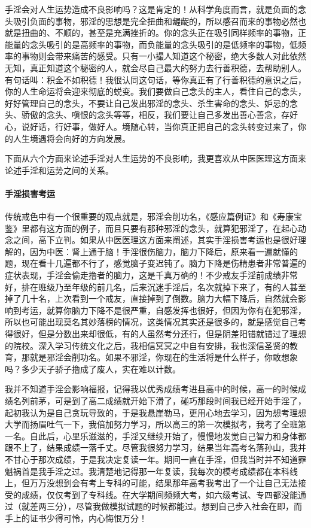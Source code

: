手淫会对人生运势造成不良影响吗？这是肯定的！从科学角度而言，就是负面的念头吸引负面的事物，邪淫的思想是完全扭曲和龌龊的，所以感召而来的事物必然也就是扭曲的、不顺的，甚至是充满挫折的。你的念头正在吸引同样频率的事物，正能量的念头吸引的是高频率的事物，而负能量的念头吸引的是低频率的事物，低频率的事物则会带来痛苦的感受。只有一小撮人知道这个秘密，绝大多数人对此依然无知，真正知道这个秘密的人，就会尽自己最大的努力去行善积德，去帮助别人。有句话叫：积金不如积德！我很认同这句话，等你真正有了行善积德的意识之后，你的人生命运将会迎来彻底的蜕变。我们要做自己念头的主人，看住自己的念头，好好管理自己的念头，不要让自己发出邪淫的念头、杀生害命的念头、妒忌的念头、骄傲的念头、嗔恨的念头等等，相反，我们要让自己多发出善心善念，存好心，说好话，行好事，做好人。境随心转，当你真正把自己的念头转变过来了，你的人生境遇将会向好的方向发展。

下面从六个方面来论述手淫对人生运势的不良影响，我更喜欢从中医医理这方面来论述手淫和运势之间的关系。

\paragraph{手淫损害考运}

传统戒色中有一个很重要的观点就是，邪淫会削功名，《感应篇例证》和《寿康宝鉴》里都有这方面的例子，而且只要有那种邪淫的念头，就算犯邪淫了，在起心动念之间，高下立判。如果从中医医理这方面来阐述，其实手淫损害考运也是很好理解的，因为中医：肾上通于脑！手淫很伤脑力，脑力下降后，原来看一遍就懂的题，现在看十几遍都不行了，感觉脑子变迟钝了。脑力下降是伤精患者非常普遍的症状表现，手淫会偷走撸者的脑力，这是千真万确的！不少戒友手淫前成绩非常好，排在班级乃至年级的前几名，后来沉迷手淫后，名次就掉下来了，有的人甚至掉了几十名，上次看到一个戒友，直接掉到了倒数。脑力大幅下降后，自然就会影响到考运，就算你脑力下降不是很严重，自感发挥也很好，但因为你有在犯邪淫，所以也可能出现莫名其妙落榜的情况，这类情况其实还是很多的，就是感觉自己考得很好，但是分数出来却很低，有的人虽然考分还行，但是阴差阳错就错过了理想的院校。深入学习传统文化之后，我相信冥冥之中自有安排，我也深信圣贤的教育，那就是邪淫会削功名。如果不邪淫，你现在的生活将是什么样子，你敢想象吗？多少天子骄子撸成了废人，实在难以计数。

\begin{case}[手淫损害考运]
    我并不知道手淫会影响福报，记得我以优秀成绩考进县高中的时候，高一的时候成绩名列前茅，可是到了高二成绩就开始下滑了，碰巧那段时间我已经开始手淫了，起初我认为是自己贪玩导致的，于是我悬崖勒马，更用心地去学习，因为想考理想大学而扬眉吐气一下，我倍加努力学习，所以高三的第一次模拟考，我考了全班第一名。自此后，心里乐滋滋的，手淫又继续开始了，慢慢地发觉自己智力和身体都跟不上了，结果成绩一落千丈。尽管我很努力学习，结果当年高考名落孙山，我并不甘心于那次成绩，于是我决定复读一年。期间一直在手淫，但我当时并不知道罪魁祸首是我手淫之过。我清楚地记得那一年复读，我每次的模考成绩都在本科线上，但万万没想到会有考上专科的可能，结果那年高考我考出了一个让自己无法接受的成绩，仅仅考到了专科线。在大学期间频频大考，如六级考试、专四都没能通过（就差两三分），尽管我做模拟试题的时候都能过。想到自己步入社会在即，而手上的证书少得可怜，内心悔恨万分！
\end{case}

